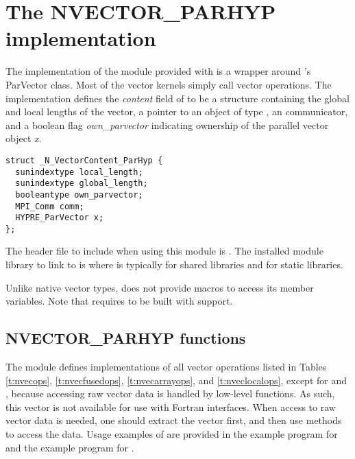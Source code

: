 %
\section{The NVECTOR\_PARHYP implementation}\label{ss:nvec_parhyp}

The {\nvecph} implementation of the {\nvector} module provided with
{\sundials} is a wrapper around {\hypre}'s ParVector class. 
Most of the vector kernels simply call {\hypre} vector operations. 
The implementation defines the {\em content} field of  to 
be a structure containing the global and local lengths of the vector, a 
pointer to an object of type , an {\mpi} communicator, 
and a boolean flag {\em own\_parvector} indicating ownership of the
{\hypre} parallel vector object {\em x}.
\begin{verbatim}
struct _N_VectorContent_ParHyp {
  sunindextype local_length;
  sunindextype global_length;
  booleantype own_parvector;
  MPI_Comm comm;
  HYPRE_ParVector x;
};
\end{verbatim}
The header file to include when using this module is .
The installed module library to link to is
where  is typically  for shared libraries and 
for static libraries.

Unlike native {\sundials} vector types, {\nvecph} does not provide macros 
to access its member variables.
Note that {\nvecph} requires {\sundials} to be built with {\mpi} support.


\subsection{NVECTOR\_PARHYP functions}
\label{ss:nvec_parhyp_functions}

The {\nvecph} module defines implementations of all vector operations 
listed in Tables \ref{t:nvecops}, \ref{t:nvecfusedops},
\ref{t:nvecarrayops}, and \ref{t:nveclocalops}, except
for  and , because accessing raw vector
data is handled by low-level {\hypre} functions.
As such, this vector is not available for use with {\sundials} Fortran interfaces.
When access to raw vector data is needed, one
should extract the {\hypre} vector first, and then use {\hypre}
methods to access the data. Usage examples of {\nvecph} are provided in
the  example program for {\cvode} \cite{cvode_ex}
and the  example program for {\arkode} \cite{arkode_ex}.

